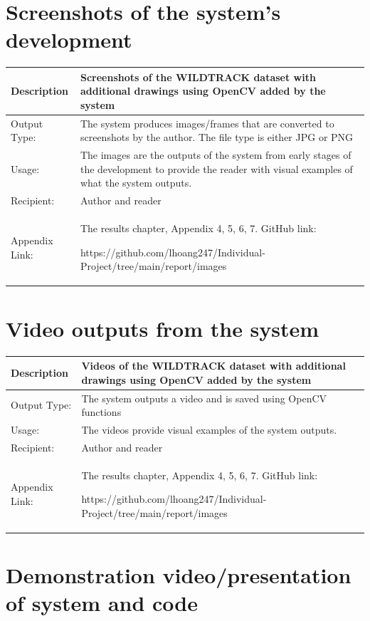 \documentclass[12pt]{report}
\begin{document}
\section{Screenshots of the system's development}

\begin{tabular}{|p{2.2cm}|p{11cm}|}
	\hline
	Description & Screenshots of the WILDTRACK dataset with additional drawings using OpenCV added by the system\\
	\hline
	Output Type: & The system produces images/frames that are converted to screenshots by the author. The file type is either JPG or PNG  \\
	\hline
	Usage: & The images are the outputs of the system from early stages of the development to provide the reader with visual examples of what the system outputs. \\
	\hline
	Recipient: & Author and reader \\
	\hline
	Appendix Link: & The results chapter, Appendix 4, 5, 6, 7. GitHub link: 
	
	https://github.com/lhoang247/Individual-Project/tree/main/report/images \\
	\hline
\end{tabular}

\pagebreak

\section{Video outputs from the system}

\begin{tabular}{|p{2.2cm}|p{11cm}|}
	\hline
	Description & Videos of the WILDTRACK dataset with additional drawings using OpenCV added by the system\\
	\hline
	Output Type: & The system outputs a video and is saved using OpenCV functions \\
	\hline
	Usage: & The videos provide visual examples of the system outputs. \\
	\hline
	Recipient: & Author and reader \\
	\hline
	Appendix Link: & The results chapter, Appendix 4, 5, 6, 7. GitHub link: 
	
	https://github.com/lhoang247/Individual-Project/tree/main/report/images \\
	\hline
\end{tabular}

\section{Demonstration video/presentation of system and code}
\end{document}
